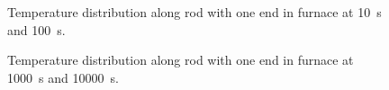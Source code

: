 \begin{figure}
    \centering
    \caption{Temperature distribution along rod with one end in furnace at \SI{10}{\second} and \SI{100}{\second}.}
\end{figure}

\begin{figure}
    \ContinuedFloat
    \centering
    \caption{Temperature distribution along rod with one end in furnace at \SI{1000}{\second} and \SI{10000}{\second}.}
    \label{fig:hot_diffusion_normal}
\end{figure}

